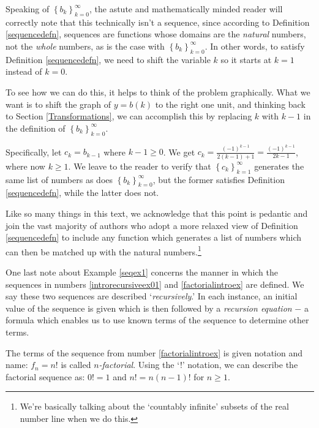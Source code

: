 \documentclass{ximera}
\begin{document}
Speaking of $\left\{ b_{k} \right\}_{k=0}^{\infty}$, the astute and mathematically minded reader will correctly note that this technically isn't a sequence, since according to Definition \ref{sequencedefn}, sequences are functions whose domains are the \textit{natural} numbers, not the \textit{whole} numbers, as is the case with $\left\{ b_{k} \right\}_{k=0}^{\infty}$.  In other words, to satisfy Definition \ref{sequencedefn}, we need to shift the variable $k$ so it starts at $k=1$ instead of $k=0$.  

To see how we can do this, it helps to think of the problem graphically.  What we want is to shift the graph of $y=b(k)$ to the right one unit, and thinking back to Section \ref{Transformations}, we can accomplish this by replacing $k$ with $k-1$ in the definition of $\left\{ b_{k} \right\}_{k=0}^{\infty}$.  

Specifically, let $c_{k} = b_{k-1}$ where $k - 1 \geq 0$.  We get $c_{k} = \frac{(-1)^{k-1}}{2(k-1)+1} = \frac{(-1)^{k-1}}{2k-1}$, where now $k \geq 1$. We leave to the reader to verify that $\left\{ c_{k} \right\}_{k=1}^{\infty}$ generates the same list of numbers as does $\left\{ b_{k} \right\}_{k=0}^{\infty}$, but the former satisfies Definition \ref{sequencedefn}, while the latter does not.   

Like so many things in this text, we acknowledge that this point is pedantic and join the vast majority of authors who adopt a more relaxed view of Definition \ref{sequencedefn} to include any function which generates a list of numbers which can then be matched up with the natural numbers.\footnote{We're basically talking about the `countably infinite' subsets of the real number line when we do this.}   


 One last note about Example \ref{seqex1} concerns the manner in which the sequences in numbers  \ref {introrecursiveex01} and \ref{factorialintroex} are defined.  We say these two sequences are  described  `\textit{recursively}.'  In each instance, an initial value of the sequence is given which is then followed by a  \textit{recursion equation} $-$ a formula which enables us to use known terms of the sequence to determine other terms.  
 
 The terms of the sequence from number  \ref{factorialintroex} is given notation and name:  $f_{n}=n!$ is called  \textit{$n$-factorial}.  Using the `!' notation, we can describe the factorial sequence as: $0! = 1$ and $n! = n(n-1)!$ for $n \geq 1$. 
 
\end{document}
